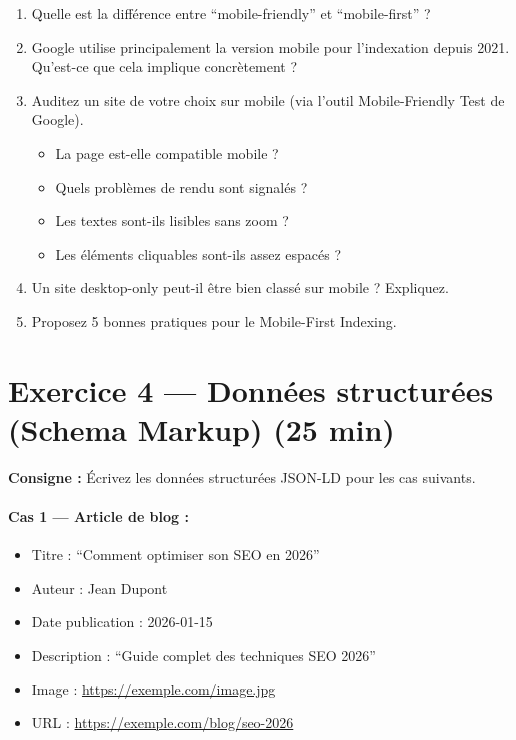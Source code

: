 \documentclass[12pt,a4paper]{report}
\begin{document}
\begin{enumerate}
    \item Quelle est la diff\'{e}rence entre ``mobile-friendly'' et ``mobile-first'' ?
    \item Google utilise principalement la version mobile pour l'indexation depuis 2021. Qu'est-ce que cela implique concr\`{e}tement ?
    \item Auditez un site de votre choix sur mobile (via l'outil Mobile-Friendly Test de Google).
    \begin{itemize}
        \item La page est-elle compatible mobile ?
        \item Quels probl\`{e}mes de rendu sont signal\'{e}s ?
        \item Les textes sont-ils lisibles sans zoom ?
        \item Les \'{e}l\'{e}ments cliquables sont-ils assez espac\'{e}s ?
    \end{itemize}
    \item Un site desktop-only peut-il \^{e}tre bien class\'{e} sur mobile ? Expliquez.
    \item Proposez 5 bonnes pratiques pour le Mobile-First Indexing.
\end{enumerate}

\section{Exercice 4 --- Donn\'{e}es structur\'{e}es (Schema Markup) (25 min)}

\textbf{Consigne :} \'{E}crivez les donn\'{e}es structur\'{e}es JSON-LD pour les cas suivants.

\paragraph{Cas 1 --- Article de blog :}
\begin{itemize}
    \item Titre : ``Comment optimiser son SEO en 2026''
    \item Auteur : Jean Dupont
    \item Date publication : 2026-01-15
    \item Description : ``Guide complet des techniques SEO 2026''
    \item Image : \url{https://exemple.com/image.jpg}
    \item URL : \url{https://exemple.com/blog/seo-2026}
\end{itemize}
\end{document}
